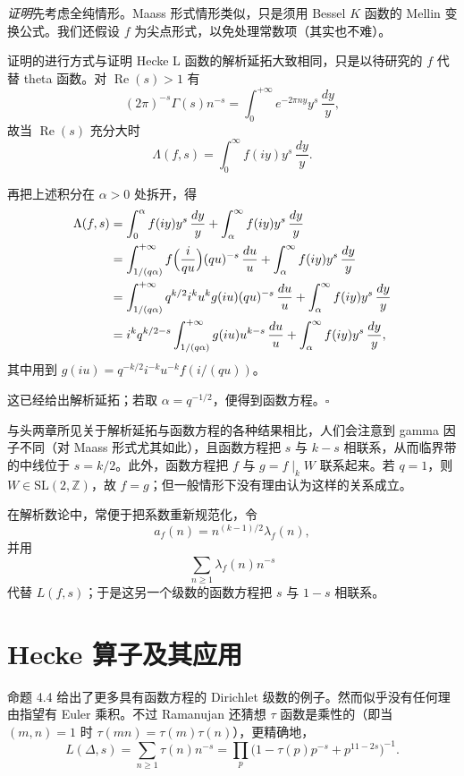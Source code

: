 \emph{证明}\quad 先考虑全纯情形。Maass 形式情形类似，只是须用 Bessel $K$ 函数的 Mellin 变换公式。我们还假设 $f$ 为尖点形式，以免处理常数项（其实也不难）。

证明的进行方式与证明 Hecke L 函数的解析延拓大致相同，只是以待研究的 $f$ 代替 theta 函数。对 $\operatorname{Re}(s)>1$ 有
\[
(2\pi)^{-s}\Gamma(s)n^{-s}=\int_{0}^{+\infty}e^{-2\pi ny}y^{s}\,\frac{dy}{y},
\]
故当 $\operatorname{Re}(s)$ 充分大时
\begin{equation}\tag{4.14}\label{c3:eq:4.14}
\Lambda(f,s)=\int_{0}^{\infty}f(iy)y^{s}\,\frac{dy}{y}.
\end{equation}

再把上述积分在 $\alpha>0$ 处拆开，得
\begin{align*}
\Lambda(f,s)&=\int_{0}^{\alpha}f(iy)y^{s}\,\frac{dy}{y}+\int_{\alpha}^{\infty}f(iy)y^{s}\,\frac{dy}{y}\\
&=\int_{1/(q\alpha)}^{+\infty}f\Bigl(\frac{i}{qu}\Bigr)(qu)^{-s}\,\frac{du}{u}+\int_{\alpha}^{\infty}f(iy)y^{s}\,\frac{dy}{y}\\
&=\int_{1/(q\alpha)}^{+\infty}q^{k/2}i^{k}u^{k}g(iu)(qu)^{-s}\,\frac{du}{u}+\int_{\alpha}^{\infty}f(iy)y^{s}\,\frac{dy}{y}\\
&=i^{k}q^{k/2-s}\int_{1/(q\alpha)}^{+\infty}g(iu)u^{k-s}\,\frac{du}{u}+\int_{\alpha}^{\infty}f(iy)y^{s}\,\frac{dy}{y},
\end{align*}
其中用到 $g(iu)=q^{-k/2}i^{-k}u^{-k}f(i/(qu))$。

这已经给出解析延拓；若取 $\alpha=q^{-1/2}$，便得到函数方程。\hfill$\square$

与头两章所见关于解析延拓与函数方程的各种结果相比，人们会注意到 gamma 因子不同（对 Maass 形式尤其如此），且函数方程把 $s$ 与 $k-s$ 相联系，从而临界带的中线位于 $s=k/2$。此外，函数方程把 $f$ 与 $g=f\mid_{k}W$ 联系起来。若 $q=1$，则 $W\in\mathrm{SL}(2,\mathbb{Z})$，故 $f=g$；但一般情形下没有理由认为这样的关系成立。

在解析数论中，常便于把系数重新规范化，令
\[
a_{f}(n)=n^{(k-1)/2}\lambda_{f}(n),
\]
并用
\[
\sum_{n\ge1}\lambda_{f}(n)n^{-s}
\]
代替 $L(f,s)$；于是这另一个级数的函数方程把 $s$ 与 $1-s$ 相联系。

\section{Hecke 算子及其应用}\label{c3:sec:5}

命题 4.4 给出了更多具有函数方程的 Dirichlet 级数的例子。然而似乎没有任何理由指望有 Euler 乘积。不过 Ramanujan 还猜想 $\tau$ 函数是乘性的（即当 $(m,n)=1$ 时 $\tau(mn)=\tau(m)\tau(n)$），更精确地，
\begin{equation}\tag{5.1}\label{c3:eq:5.1}
L(\Delta,s)=\sum_{n\ge1}\tau(n)n^{-s}=\prod_{p}\bigl(1-\tau(p)p^{-s}+p^{11-2s}\bigr)^{-1}.
\end{equation}

